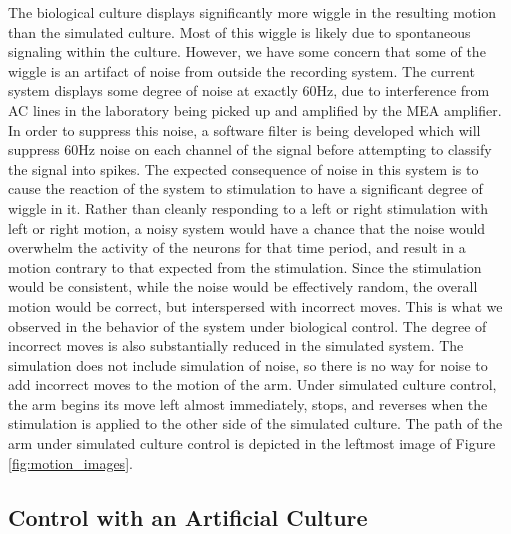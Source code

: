\documentclass[letterpaper]{article}
\begin{document}
The biological culture displays significantly more wiggle in the resulting motion than the simulated culture.
Most of this wiggle is likely due to spontaneous signaling within the culture.
However, we have some concern that some of the wiggle is an artifact of noise from outside the recording system. 
The current system displays some degree of noise at exactly 60Hz, due to interference from AC lines in the laboratory being picked up and amplified by the MEA amplifier. 
In order to suppress this noise, a software filter is being developed which will suppress 60Hz noise on each channel of the signal before attempting to classify the signal into spikes. 
The expected consequence of noise in this system is to cause the reaction of the system to stimulation to have a significant degree of wiggle in it. 
Rather than cleanly responding to a left or right stimulation with left or right motion, a noisy system would have a chance that the noise would overwhelm the activity of the neurons for that time period, and result in a motion contrary to that expected from the stimulation. 
Since the stimulation would be consistent, while the noise would be effectively random, the overall motion would be correct, but interspersed with incorrect moves. 
This is what we observed in the behavior of the system under biological control.
The degree of incorrect moves is also substantially reduced in the simulated system.
The simulation does not include simulation of noise, so there is no way for noise to add incorrect moves to the motion of the arm. 
Under simulated culture control, the arm begins its move left almost immediately, stops, and reverses when the stimulation is applied to the other side of the simulated culture. 
The path of the arm under simulated culture control is depicted in the leftmost image of Figure \ref{fig:motion_images}.


\subsection{Control with an Artificial Culture}
\end{document}
